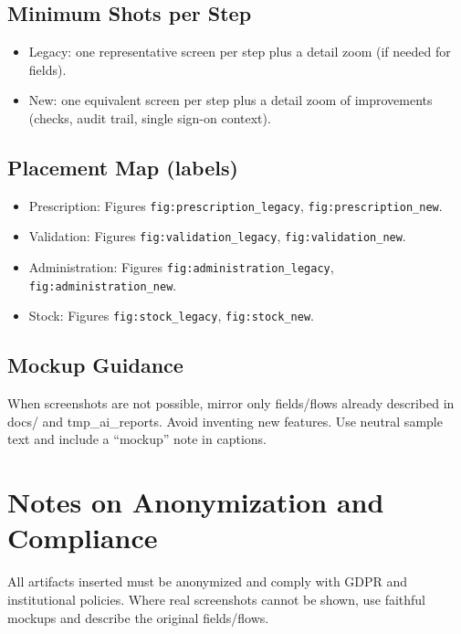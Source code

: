 \subsection*{Minimum Shots per Step}
\begin{itemize}
    \item Legacy: one representative screen per step plus a detail zoom (if needed for fields).
    \item New: one equivalent screen per step plus a detail zoom of improvements (checks, audit trail, single sign-on context).
\end{itemize}

\subsection*{Placement Map (labels)}
\begin{itemize}
    \item Prescription: Figures \texttt{fig:prescription\_legacy}, \texttt{fig:prescription\_new}.
    \item Validation: Figures \texttt{fig:validation\_legacy}, \texttt{fig:validation\_new}.
    \item Administration: Figures \texttt{fig:administration\_legacy}, \texttt{fig:administration\_new}.
    \item Stock: Figures \texttt{fig:stock\_legacy}, \texttt{fig:stock\_new}.
\end{itemize}

\subsection*{Mockup Guidance}
When screenshots are not possible, mirror only fields/flows already described in docs/ and tmp\_ai\_reports. Avoid inventing new features. Use neutral sample text and include a “mockup” note in captions.

\section{Notes on Anonymization and Compliance}
\begingroup\sloppy
All artifacts inserted must be anonymized and comply with GDPR and institutional policies. Where real screenshots cannot be shown, use faithful mockups and describe the original fields/flows.
\endgroup

